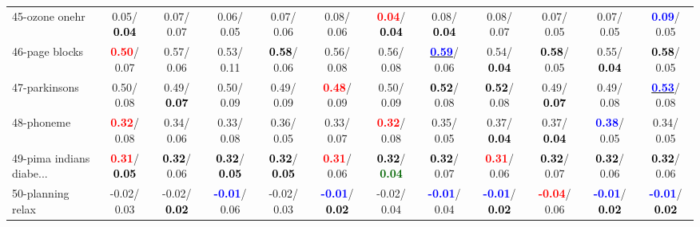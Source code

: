 \begin{table}[h]
\begin{center}
{\begin{tabular}{lc|c|c|c|c|c|c|c|c|c|c}
45-ozone onehr &   0.05/\textcolor{black}{\textbf{  0.04}} &   0.07/  0.07 &   0.06/  0.05 &   0.07/  0.06 &   0.08/  0.06 & \textcolor{red}{\textbf{  0.04}}/\textcolor{black}{\textbf{  0.04}} &   0.08/\textcolor{black}{\textbf{  0.04}} &   0.08/  0.07 &   0.07/  0.05 &   0.07/  0.05 & \textcolor{blue}{\textbf{  0.09}}/  0.05 \\
46-page blocks & \textcolor{red}{\textbf{  0.50}}/  0.07 &   0.57/  0.06 &   0.53/  0.11 & \textcolor{black}{\textbf{  0.58}}/  0.06 &   0.56/  0.08 &   0.56/  0.08 & \underline{\textcolor{blue}{\textbf{  0.59}}}/  0.06 &   0.54/\textcolor{black}{\textbf{  0.04}} & \textcolor{black}{\textbf{  0.58}}/  0.05 &   0.55/\textcolor{black}{\textbf{  0.04}} & \textcolor{black}{\textbf{  0.58}}/  0.05 \\ \hline
47-parkinsons &   0.50/  0.08 &   0.49/\textcolor{black}{\textbf{  0.07}} &   0.50/  0.09 &   0.49/  0.09 & \textcolor{red}{\textbf{  0.48}}/  0.09 &   0.50/  0.09 & \textcolor{black}{\textbf{  0.52}}/  0.08 & \textcolor{black}{\textbf{  0.52}}/  0.08 &   0.49/\textcolor{black}{\textbf{  0.07}} &   0.49/  0.08 & \underline{\textcolor{blue}{\textbf{  0.53}}}/  0.08 \\
48-phoneme & \textcolor{red}{\textbf{  0.32}}/  0.08 &   0.34/  0.06 &   0.33/  0.08 &   0.36/  0.05 &   0.33/  0.07 & \textcolor{red}{\textbf{  0.32}}/  0.08 &   0.35/  0.05 &   0.37/\textcolor{black}{\textbf{  0.04}} &   0.37/\textcolor{black}{\textbf{  0.04}} & \textcolor{blue}{\textbf{  0.38}}/  0.05 &   0.34/  0.05 \\
49-pima indians diabe... & \textcolor{red}{\textbf{  0.31}}/\textcolor{black}{\textbf{  0.05}} & \textcolor{black}{\textbf{  0.32}}/  0.06 & \textcolor{black}{\textbf{  0.32}}/\textcolor{black}{\textbf{  0.05}} & \textcolor{black}{\textbf{  0.32}}/\textcolor{black}{\textbf{  0.05}} & \textcolor{red}{\textbf{  0.31}}/  0.06 & \textcolor{black}{\textbf{  0.32}}/\textcolor{darkgreen}{\textbf{  0.04}} & \textcolor{black}{\textbf{  0.32}}/  0.07 & \textcolor{red}{\textbf{  0.31}}/  0.06 & \textcolor{black}{\textbf{  0.32}}/  0.07 & \textcolor{black}{\textbf{  0.32}}/  0.06 & \textcolor{black}{\textbf{  0.32}}/  0.06 \\
50-planning relax &  -0.02/  0.03 &  -0.02/\textcolor{black}{\textbf{  0.02}} & \textcolor{blue}{\textbf{ -0.01}}/  0.06 &  -0.02/  0.03 & \textcolor{blue}{\textbf{ -0.01}}/\textcolor{black}{\textbf{  0.02}} &  -0.02/  0.04 & \textcolor{blue}{\textbf{ -0.01}}/  0.04 & \textcolor{blue}{\textbf{ -0.01}}/\textcolor{black}{\textbf{  0.02}} & \textcolor{red}{\textbf{ -0.04}}/  0.06 & \textcolor{blue}{\textbf{ -0.01}}/\textcolor{black}{\textbf{  0.02}} & \textcolor{blue}{\textbf{ -0.01}}/\textcolor{black}{\textbf{  0.02}} \\

\end{tabular}}
\end{center}
\end{table}
